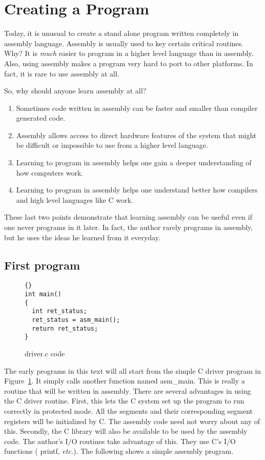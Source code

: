\section{Creating a Program}

Today, it is unusual to create a stand alone program written
completely in assembly language. Assembly is usually used to key certain
critical routines. Why? It is \emph{much} easier to program in a higher level 
language than in assembly. Also, using assembly makes a program very hard to
port to other platforms. In fact, it is rare to use assembly at all.

So, why should anyone learn assembly at all?
\begin{enumerate}
\item Sometimes code written in assembly can be faster and smaller than
      compiler generated code.
\item Assembly allows access to direct hardware features of the system that
      might be difficult or impossible to use from a higher level language.
\item Learning to program in assembly helps one gain a deeper understanding of
      how computers work.
\item Learning to program in assembly helps one understand better how compilers
      and high level languages like C work.
\end{enumerate}
These last two points demonstrate that learning assembly can be useful even if
one never programs in it later. In fact, the author rarely programs in
assembly, but he uses the ideas he learned from it everyday.

\subsection{First program}

\begin{figure}[t]
\begin{lstlisting}[frame=tlrb]{}
int main()
{
  int ret_status;
  ret_status = asm_main();
  return ret_status;
}
\end{lstlisting}
\caption{{\code driver.c} code\label{fig:driverProg} }
\end{figure}

The early programs in this text will all start from the simple C
driver program in Figure~\ref{fig:driverProg}. It simply calls
another function named {\code asm\_main}. This is really a routine
that will be written in assembly. There are several advantages in
using the C driver routine. First, this lets the C system set up the
program to run correctly in protected mode. All the segments and their
corresponding segment registers will be initialized by C. The assembly
code need not worry about any of this. Secondly, the C library will
also be available to be used by the assembly code. The author's I/O
routines take advantage of this. They use C's I/O functions ({\code
printf}, {\em etc.}).  The following shows a simple assembly program.

